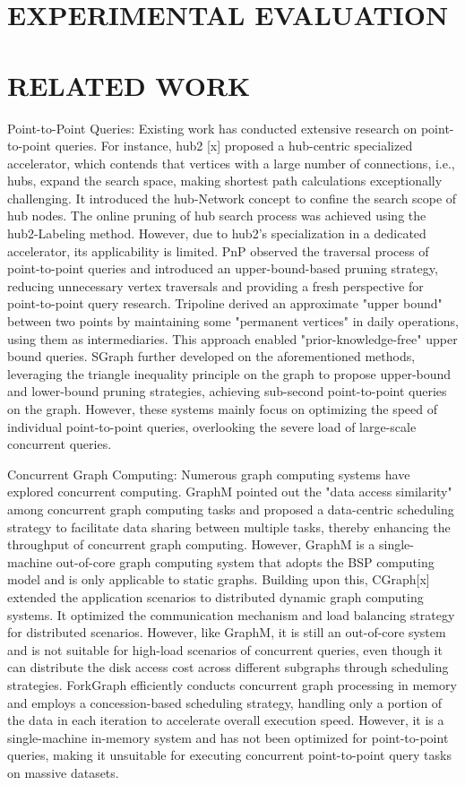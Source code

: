 \documentclass[lettersize,journal]{IEEEtran} %
\begin{document}
\section{EXPERIMENTAL EVALUATION}

\section{RELATED WORK}
Point-to-Point Queries: Existing work has conducted extensive research on point-to-point queries. For instance, hub2 [x] proposed a hub-centric specialized accelerator, which contends that vertices with a large number of connections, i.e., hubs, expand the search space, making shortest path calculations exceptionally challenging. It introduced the hub-Network concept to confine the search scope of hub nodes. The online pruning of hub search process was achieved using the hub2-Labeling method. However, due to hub2's specialization in a dedicated accelerator, its applicability is limited. PnP observed the traversal process of point-to-point queries and introduced an upper-bound-based pruning strategy, reducing unnecessary vertex traversals and providing a fresh perspective for point-to-point query research. Tripoline derived an approximate "upper bound" between two points by maintaining some "permanent vertices" in daily operations, using them as intermediaries. This approach enabled "prior-knowledge-free" upper bound queries. SGraph further developed on the aforementioned methods, leveraging the triangle inequality principle on the graph to propose upper-bound and lower-bound pruning strategies, achieving sub-second point-to-point queries on the graph. However, these systems mainly focus on optimizing the speed of individual point-to-point queries, overlooking the severe load of large-scale concurrent queries.

Concurrent Graph Computing: Numerous graph computing systems have explored concurrent computing. GraphM pointed out the "data access similarity" among concurrent graph computing tasks and proposed a data-centric scheduling strategy to facilitate data sharing between multiple tasks, thereby enhancing the throughput of concurrent graph computing. However, GraphM is a single-machine out-of-core graph computing system that adopts the BSP computing model and is only applicable to static graphs. Building upon this, CGraph[x] extended the application scenarios to distributed dynamic graph computing systems. It optimized the communication mechanism and load balancing strategy for distributed scenarios. However, like GraphM, it is still an out-of-core system and is not suitable for high-load scenarios of concurrent queries, even though it can distribute the disk access cost across different subgraphs through scheduling strategies. ForkGraph efficiently conducts concurrent graph processing in memory and employs a concession-based scheduling strategy, handling only a portion of the data in each iteration to accelerate overall execution speed. However, it is a single-machine in-memory system and has not been optimized for point-to-point queries, making it unsuitable for executing concurrent point-to-point query tasks on massive datasets.
\end{document}

